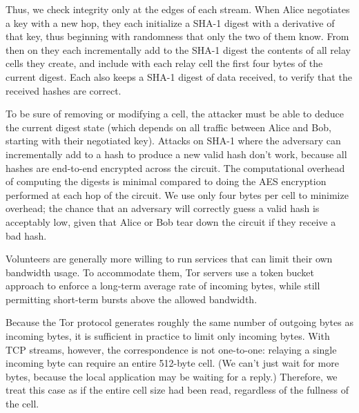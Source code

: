 \documentclass[times,10pt,twocolumn]{article}
\begin{document}
Thus, we check integrity only at the edges of each stream. When Alice
negotiates a key with a new hop, they each initialize a SHA-1
digest with a derivative of that key,
thus beginning with randomness that only the two of them know. From
then on they each incrementally add to the SHA-1 digest the contents of
all relay cells they create, and include with each relay cell the
first four bytes of the current digest.  Each also keeps a SHA-1
digest of data received, to verify that the received hashes are correct.

To be sure of removing or modifying a cell, the attacker must be able
to deduce the current digest state (which depends on all
traffic between Alice and Bob, starting with their negotiated key).
Attacks on SHA-1 where the adversary can incrementally add to a hash
to produce a new valid hash don't work, because all hashes are
end-to-end encrypted across the circuit.  The computational overhead
of computing the digests is minimal compared to doing the AES
encryption performed at each hop of the circuit. We use only four
bytes per cell to minimize overhead; the chance that an adversary will
correctly guess a valid hash
is
acceptably low, given that Alice or Bob tear down the circuit if they
receive a bad hash.

\label{subsec:rate-limit}

Volunteers are generally more willing to run services that can limit
their own bandwidth usage. To accommodate them, Tor servers use a
token bucket approach \cite{tannenbaum96} to
enforce a long-term average rate of incoming bytes, while still
permitting short-term bursts above the allowed bandwidth.


Because the Tor protocol generates roughly the same number of outgoing
bytes as incoming bytes, it is sufficient in practice to limit only
incoming bytes.
With TCP streams, however, the correspondence is not one-to-one:
relaying a single incoming byte can require an entire 512-byte cell.
(We can't just wait for more bytes, because the local application may
be waiting for a reply.) Therefore, we treat this case as if the entire
cell size had been read, regardless of the fullness of the cell.
\end{document}
